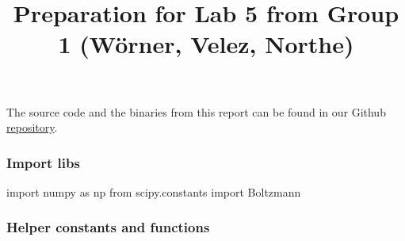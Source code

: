 \documentclass[
  letterpaper,
  DIV=11,
  numbers=noendperiod]{scrartcl}
\title{Preparation for Lab 5 from Group 1 (Wörner, Velez, Northe)}
\author{}
\date{}
\newenvironment{Shaded}{\begin{snugshade}}{\end{snugshade}}
\newcommand{\ImportTok}[1]{\textcolor[rgb]{0.00,0.46,0.62}{#1}}
\newcommand{\NormalTok}[1]{\textcolor[rgb]{0.00,0.23,0.31}{#1}}
\begin{document}
\maketitle


The source code and the binaries from this report can be found in our
Github
\href{https://github.com/NortheLo/Microwave_Eng_Lab/tree/main/Lab5_Antennas}{repository}.

\subsubsection{Import libs}\label{import-libs}

\begin{Shaded}
\begin{Highlighting}[]
\ImportTok{import}\NormalTok{ numpy }\ImportTok{as}\NormalTok{ np}
\ImportTok{from}\NormalTok{ scipy.constants }\ImportTok{import}\NormalTok{ Boltzmann}
\end{Highlighting}
\end{Shaded}

\subsubsection{Helper constants and
functions}\label{helper-constants-and-functions}
\end{document}
